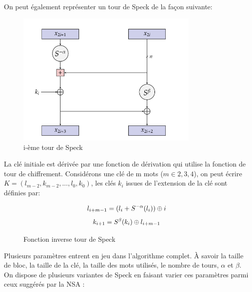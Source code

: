 On peut également représenter un tour de Speck de la façon suivante:

\begin{figure}[H]
	\centering
	\includegraphics[width=0.8\textwidth]{imgs/roundSpeck.png}
	\caption{i-ème tour de Speck}
	\label{roundSpeck}
\end{figure}

\vspace{0.3cm}

La clé initiale est dérivée par une fonction de dérivation qui utilise la
fonction de tour de chiffrement. Considérons une clé de m mots ($m\in {2,3,4}$),
on peut écrire $ K = (l_{m-2},k_{m-2}, ..., l_0,k_0)$, les clés $k_i$ issues
de l'extension de la clé sont définies par:

\begin{figure}[H]
	\centering
	\[
		l_{i+m-1} = (l_i + S^{-\alpha}(l_i)) \mathbin{\oplus} i
	\]
	\[
		k_{i+1} = S^\beta (k_i) \mathbin{\oplus} l_{i+m-1}
	\]
	\caption{Fonction inverse tour de Speck}
	\label{tourSpeck}
\end{figure}

Plusieurs paramètres entrent en jeu dans l'algorithme complet. À savoir
la taille de bloc, la taille de la clé, la taille des mots utilisés,
le nombre de tours, $\alpha$ et $\beta$. On dispose de plusieurs variantes
de Speck en faisant varier ces paramètres parmi ceux suggérés par la NSA \cite{speck_iot}:



\vspace{0.5cm}

